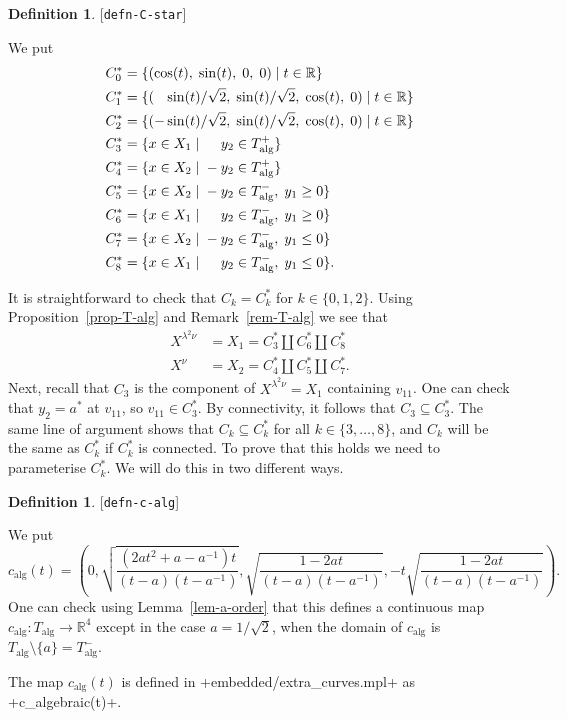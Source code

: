 \documentclass[reqno]{amsart}
\newcommand{\lbl}[1]{\label{#1}\textup{[\texttt{#1}]}\par}
\newcommand{\lbl}{\label}
\newcommand{\alg}	{\operatorname{alg}}
\newcommand{\lm}        {\lambda}
\newcommand{\R}         {{\mathbb{R}}}
\newcommand{\st}        {\;|\;}
\newcommand{\sm}        {\setminus}
\newcommand{\sse}       {\subseteq}
\newcommand{\rt}        {\sqrt{2}}
\newcommand{\pp}        {\hphantom{+}}
\renewcommand{\:}{\colon}
\theoremstyle{definition}
\newtheorem{definition}[theorem]{Definition}
\begin{document}
\begin{definition}\lbl{defn-C-star}
 We put
 \begin{align*}
  C_0^* &= \{(\cos(t),\;\sin(t),\;0,\;0)\st t\in\R\} \\
  C_1^* &= \{(\pp\sin(t)/\rt,\;\sin(t)/\rt,\;\cos(t),\;0)\st t\in\R\} \\
  C_2^* &= \{(  -\sin(t)/\rt,\;\sin(t)/\rt,\;\cos(t),\;0)\st t\in\R\} \\
  C_3^* &= \{x\in X_1\;|\hspace{0.75em} \pp y_2\in T_{\alg}^+\} \\
  C_4^* &= \{x\in X_2\;|\hspace{0.30em}    -y_2\in T_{\alg}^+\} \\
  C_5^* &= \{x\in X_2\;|\hspace{0.30em}    -y_2\in T_{\alg}^-,\; y_1\geq 0\} \\
  C_6^* &= \{x\in X_1\;|\hspace{0.75em} \pp y_2\in T_{\alg}^-,\; y_1\geq 0\} \\
  C_7^* &= \{x\in X_2\;|\hspace{0.30em}    -y_2\in T_{\alg}^-,\; y_1\leq 0\} \\
  C_8^* &= \{x\in X_1\;|\hspace{0.75em} \pp y_2\in T_{\alg}^-,\; y_1\leq 0\}.
 \end{align*}
\end{definition}
It is straightforward to check that $C_k=C_k^*$ for $k\in\{0,1,2\}$.
Using Proposition~\ref{prop-T-alg} and Remark~\ref{rem-T-alg} we see
that
\begin{align*}
 X^{\lm^2\nu} &= X_1 = C_3^* \amalg C_6^* \amalg C_8^* \\
 X^\nu        &= X_2 = C_4^* \amalg C_5^* \amalg C_7^*.
\end{align*}
Next, recall that $C_3$ is the component of $X^{\lm^2\nu}=X_1$
containing $v_{11}$.  One can check that $y_2=a^*$ at $v_{11}$, so
$v_{11}\in C_3^*$.  By connectivity, it follows that
$C_3\sse C_3^*$.  The same line of argument shows that
$C_k\sse C_k^*$ for all $k\in\{3,\dotsc,8\}$, and $C_k$ will be the
same as $C_k^*$ if $C_k^*$ is connected.  To prove that this holds
we need to parameterise $C_k^*$.  We will do this in two different
ways.

\begin{definition}\lbl{defn-c-alg}
 We put
 \[ c_{\alg}(t) =
   \left(0,
         \sqrt{\frac{(2at^2+a-a^{-1})t}{(t-a)(t-a^{-1})}},
         \sqrt{\frac{1-2at}{(t-a)(t-a^{-1})}},
         -t\sqrt{\frac{1-2at}{(t-a)(t-a^{-1})}}
   \right).
 \]
 One can check using Lemma~\ref{lem-a-order} that this defines a
 continuous map $c_{\alg}\:T_{\alg}\to\R^4$ except in
 the case $a=1/\rt$, when the domain of $c_{\alg}$ is
 $T_{\alg}\sm\{a\}=T_{\alg}^-$.
\end{definition}
The map $c_{\alg}(t)$ is defined in \fname+embedded/extra_curves.mpl+
as \mcode+c_algebraic(t)+.
\end{document}
